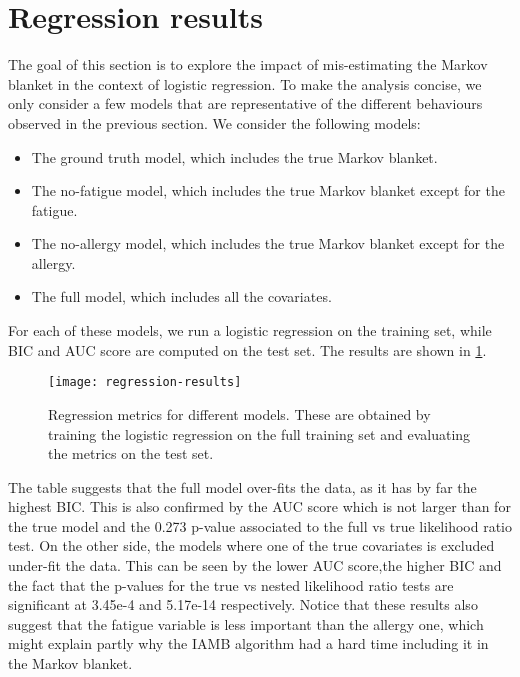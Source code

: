 \documentclass[a4paper, 12pt,oneside]{article}
\begin{document}
    \section{Regression results}
    The goal of this section is to explore the impact of mis-estimating the Markov blanket in the context of logistic regression. To make the analysis concise, we only consider a few models that are representative of the different behaviours observed in the previous section. We consider the following models:
    \begin{itemize}
        \item The ground truth model, which includes the true Markov blanket.
        \item The no-fatigue model, which includes the true Markov blanket except for the fatigue.
        \item The no-allergy model, which includes the true Markov blanket except for the allergy.
        \item The full model, which includes all the covariates. 
    \end{itemize}
    For each of these models, we run a logistic regression on the training set, while BIC and AUC score are computed on the test set. The results are shown in \ref{tab:regression-results}.
        \begin{figure}[h!]
        \centering
        \vspace{0em}
        \texttt{[image: regression-results]}
        \caption{Regression metrics for different models. These are obtained by training the logistic regression on the full training set and evaluating the metrics on the test set.}
        \label{tab:regression-results}
    \end{figure}
    The table suggests that the full model over-fits the data, as it has by far the highest BIC. This is also confirmed by the AUC score which is not larger than for the true model and the 0.273 p-value associated to the full vs true likelihood ratio test. 
    On the other side, the models where one of the true covariates is excluded under-fit the data. This can be seen by the lower AUC score,the higher BIC and the fact that the p-values for the true vs nested likelihood ratio tests are significant at 3.45e-4 and 5.17e-14 respectively. Notice that these results also suggest that the fatigue variable is less important than the allergy one, which might explain partly why the IAMB algorithm had a hard time including it in the Markov blanket.
\end{document}
